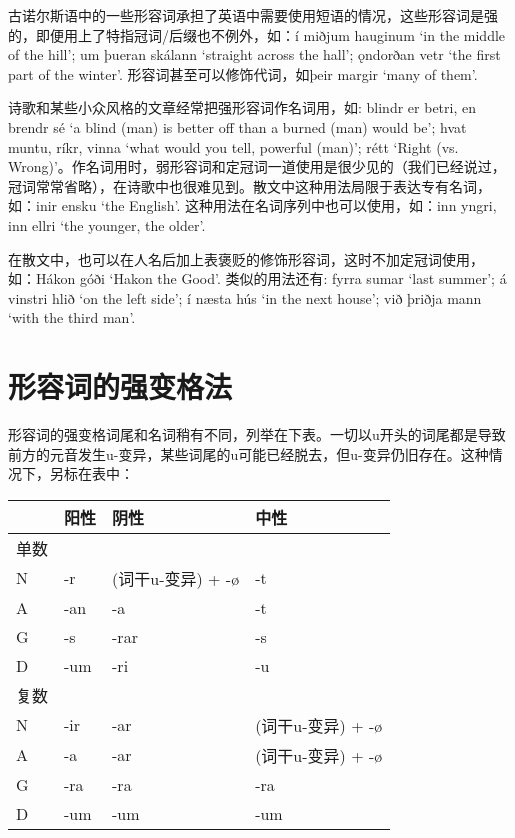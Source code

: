 古诺尔斯语中的一些形容词承担了英语中需要使用短语的情况，这些形容词是强的，即便用上了特指冠词/后缀也不例外，如：í
miðjum hauginum `in the middle of the hill‌'; um þueran skálann `straight
across the hall‌'; ǫndorðan vetr `the first part of the winter‌'.
形容词甚至可以修饰代词，如þeir margir `many of them‌'.

诗歌和某些小众风格的文章经常把强形容词作名词用，如: blindr er betri, en
brendr sé `a blind (man) is better off than a burned (man) would be‌';
hvat muntu, ríkr, vinna `what would you tell, powerful (man)‌'; rétt
`Right (vs.
Wrong)‌'。作名词用时，弱形容词和定冠词一道使用是很少见的（我们已经说过，冠词常常省略），在诗歌中也很难见到。散文中这种用法局限于表达专有名词，如：inir
ensku `the English‌'. 这种用法在名词序列中也可以使用，如：inn yngri, inn
ellri `the younger, the older‌'.

在散文中，也可以在人名后加上表褒贬的修饰形容词，这时不加定冠词使用，
如：Hákon góði `Hakon the Good‌'. 类似的用法还有: fyrra sumar `last
summer‌'; á vinstri hlið `on the left side‌'; í næsta hús `in the next
house‌'; við þriðja mann `with the third man‌'.

\section{形容词的强变格法}\label{形容词的强变格法}

形容词的强变格词尾和名词稍有不同，列举在下表。一切以u开头的词尾都是导致前方的元音发生u-变异，某些词尾的u可能已经脱去，但u-变异仍旧存在。这种情况下，另标在表中：

\begin{longtable}{llll}
  \toprule
       & 阳性 & 阴性              & 中性              \\
  \midrule
  \endhead
  \bottomrule
  \endfoot
  单数 &      &                   &                   \\
  N    & -r   & (词干u-变异) + -ø & -t                \\
  A    & -an  & -a                & -t                \\
  G    & -s   & -rar              & -s                \\
  D    & -um  & -ri               & -u                \\
  复数 &      &                   &                   \\
  N    & -ir  & -ar               & (词干u-变异) + -ø \\
  A    & -a   & -ar               & (词干u-变异) + -ø \\
  G    & -ra  & -ra               & -ra               \\
  D    & -um  & -um               & -um               \\
\end{longtable}


